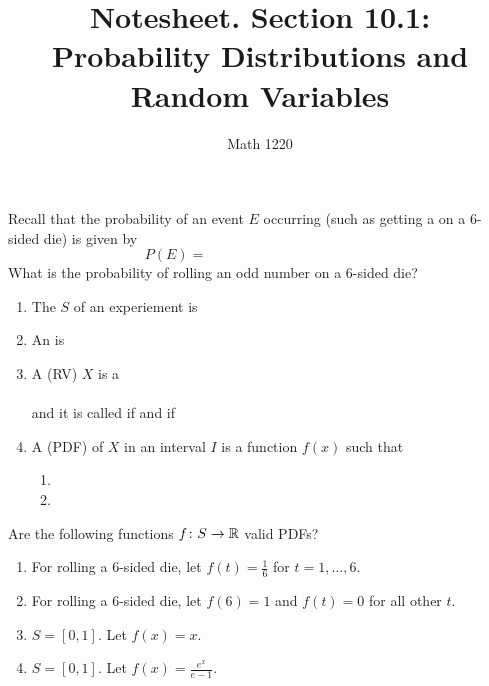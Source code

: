 \documentclass[12pt, a4paper]{article}
\author{Math 1220}
\title{Notesheet. Section 10.1: Probability Distributions and Random
  Variables}
\date{}
\begin{document}
\maketitle
\nameline
\vspace{-0.3in}
\begin{rmk}
  Recall that the probability of an event \(E\) occurring (such as
  getting a  on a \(6\)-sided die) is given by \[
    P(E) = \hspace{2in}
  \]
  What is the probability of rolling an odd number on a \(6\)-sided
  die?
  \vspace{0.5in}
\end{rmk}
\begin{defi}
  \begin{enumerate}
  \item The  \(S\) of an experiement is
  \item An  is
    \vspace{0.5in}
  \item A  (RV) \(X\) is a \\ \vspace{0.3in}\\
    and it is called  if \hspace{2in} and 
    if
    \vspace{1in}
  \item A  (PDF) of \(X\) in an
    interval \(I\) is a function \(f(x)\) such that
    \begin{enumerate}[label=(\roman*)]
    \item 
    \item
    \end{enumerate}
  \end{enumerate}
\end{defi}
\vspace{-0.6in}
\begin{ex}
  Are the following functions \(f \colon S \to {\mathbb R}\) valid PDFs?
  \begin{enumerate}
  \item For rolling a \(6\)-sided die, let \(f(t) = \frac{1}{6}\) for
    \(t=1,\ldots,6\).
    \vspace{0.3in}
  \item For rolling a \(6\)-sided die, let \(f(6)=1\) and \(f(t)=0\)
    for all other \(t\).
    \vspace{0.3in}
  \item \(S = [0,1]\). Let \(f(x)=x\).
    \vspace{0.3in}
  \item \(S = [0,1]\). Let \(f(x) = \frac{e^x}{e-1}\).
    \vspace{0.3in}
  \end{enumerate}
\end{ex}
\end{document}
